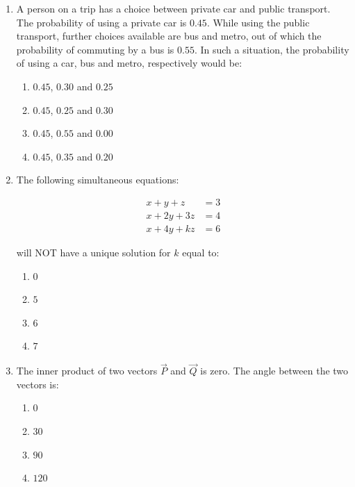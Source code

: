\documentclass[journal]{IEEEtran}
\begin{document}
\begin{enumerate}
\item A person on a trip has a choice between private car and public transport. The probability of using a private car is $0.45$. While using the public transport, further choices available are bus and metro, out of which the probability of commuting by a bus is $0.55$. In such a situation, the probability  of using a car, bus and metro, respectively would be: \textbf{}
\begin{multicols}{2}
\begin{enumerate}
\item $0.45$, $0.30$ and $0.25$
\item $0.45$, $0.25$ and $0.30$
\item $0.45$, $0.55$ and $0.00$
\item $0.45$, $0.35$ and $0.20$
\end{enumerate}
\end{multicols}

\item The following simultaneous equations: 

\begin{align}
x + y + z &= 3 \\
x + 2y + 3z &= 4 \\
x + 4y + kz &= 6
\end{align}

will NOT have a unique solution for $k$ equal to: \textbf{}
\begin{multicols}{2}
\begin{enumerate}
\item $0$
\item $5$
\item $6$
\item $7$
\end{enumerate}
\end{multicols}

\item The inner  product of two vectors $\vec{P}$ and $\vec{Q}$ is zero. The angle  between the two vectors is: \textbf{}
\begin{multicols}{2}
\begin{enumerate}
\item $0$
\item $30$
\item $90$
\item $120$
\end{enumerate}
\end{multicols}


\end{enumerate}
\end{document}

